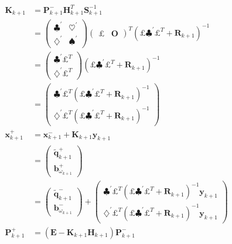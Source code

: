 \begin{align}
  \boldsymbol{K}_{k+1} &= \boldsymbol{P}_{k+1}^{-} \boldsymbol{H}_{k+1}^{T} \boldsymbol{S}_{k+1}^{-1}\\
  &=
  \begin{pmatrix}
    \clubsuit^{'} & \heartsuit^{'}\\
    \diamondsuit^{'} & \spadesuit^{'}
  \end{pmatrix}
  \begin{pmatrix}
    \pounds & \boldsymbol{O}
  \end{pmatrix}^{T}
  \left(\pounds \clubsuit^{'} \pounds^{T} + \boldsymbol{R}_{k+1}\right)^{-1}\\
  &=
  \begin{pmatrix}
    \clubsuit^{'} \pounds^{T}\\
    \diamondsuit^{'} \pounds^{T}
  \end{pmatrix}
  \left(\pounds \clubsuit^{'} \pounds^{T} + \boldsymbol{R}_{k+1}\right)^{-1}\\  &=
  \begin{pmatrix}
    \clubsuit^{'} \pounds^{T} \left(\pounds \clubsuit^{'} \pounds^{T} + \boldsymbol{R}_{k+1}\right)^{-1}\\
    \diamondsuit^{'} \pounds^{T} \left(\pounds \clubsuit^{'} \pounds^{T} + \boldsymbol{R}_{k+1}\right)^{-1}
  \end{pmatrix}\\
  \boldsymbol{x}_{k+1}^{+} &= \boldsymbol{x}_{k+1}^{-} + \boldsymbol{K}_{k+1} \boldsymbol{y}_{k+1}\\
  &=
  \begin{pmatrix}
    \tilde{\boldsymbol{q}}_{k+1}^{+}\\
    \boldsymbol{b}_{{\omega}_{k+1}}^{+}
  \end{pmatrix}\\
  &=
  \begin{pmatrix}
    \tilde{\boldsymbol{q}}_{k+1}^{-}\\
    \boldsymbol{b}_{{\omega}_{k+1}}^{-}
  \end{pmatrix} +
  \begin{pmatrix}
    \clubsuit^{'} \pounds^{T} \left(\pounds \clubsuit^{'} \pounds^{T} + \boldsymbol{R}_{k+1}\right)^{-1} \boldsymbol{y}_{k+1}\\
    \diamondsuit^{'} \pounds^{T} \left(\pounds \clubsuit^{'} \pounds^{T} + \boldsymbol{R}_{k+1}\right)^{-1} \boldsymbol{y}_{k+1}
  \end{pmatrix}\\
  \boldsymbol{P}_{k+1}^{+} &= \left(\boldsymbol{E} - \boldsymbol{K}_{k+1} \boldsymbol{H}_{k+1}\right) \boldsymbol{P}_{k+1}^{-}\\

\end{align}
